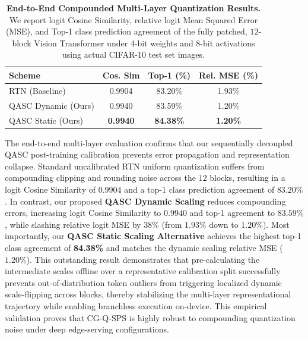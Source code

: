 \begin{table}[h]
\caption{\textbf{End-to-End Compounded Multi-Layer Quantization Results.} We report logit Cosine Similarity, relative logit Mean Squared Error (MSE), and Top-1 class prediction agreement of the fully patched, $12$-block Vision Transformer under 4-bit weights and 8-bit activations using actual CIFAR-10 test set images.}
\label{tab:compounded_quant_results}
\vskip 0.1in
\begin{center}
\begin{scriptsize}
\begin{sc}
\setlength{\tabcolsep}{1.5pt}
\begin{tabular}{lccc}
\toprule
Scheme & Cos. Sim & Top-1 (\%) & Rel. MSE (\%) \\
\midrule
RTN (Baseline) & 0.9904 & 83.20\% & 1.93\% \\
QASC Dynamic (Ours) & 0.9940 & 83.59\% & 1.20\% \\
QASC Static (Ours) & \textbf{0.9940} & \textbf{84.38\%} & \textbf{1.20\%} \\
\bottomrule
\end{tabular}
\end{sc}
\end{scriptsize}
\end{center}
\vskip -0.1in
\end{table}

The end-to-end multi-layer evaluation confirms that our sequentially decoupled QASC post-training calibration prevents error propagation and representation collapse. Standard uncalibrated RTN uniform quantization suffers from compounding clipping and rounding noise across the $12$ blocks, resulting in a logit Cosine Similarity of $0.9904$ and a top-1 class prediction agreement of $83.20\%$. In contrast, our proposed \textbf{QASC Dynamic Scaling} reduces compounding errors, increasing logit Cosine Similarity to $0.9940$ and top-1 agreement to $83.59\%$, while slashing relative logit MSE by $38\%$ (from $1.93\%$ down to $1.20\%$). Most importantly, our \textbf{QASC Static Scaling Alternative} achieves the highest top-1 class agreement of \textbf{84.38\%} and matches the dynamic scaling relative MSE ($1.20\%$). This outstanding result demonstrates that pre-calculating the intermediate scales offline over a representative calibration split successfully prevents out-of-distribution token outliers from triggering localized dynamic scale-flipping across blocks, thereby stabilizing the multi-layer representational trajectory while enabling branchless execution on-device. This empirical validation proves that CG-Q-SPS is highly robust to compounding quantization noise under deep edge-serving configurations.

